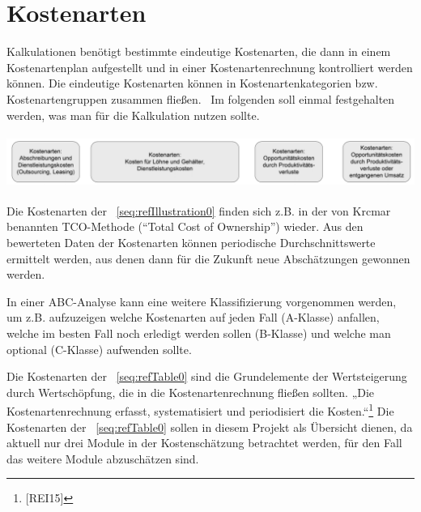 \documentclass[a4paper]{article}
\title{}
\makeatletter
\newcommand\captionof[1]{\def\@captype{#1}\caption}
\makeatother
\begin{document}
\setcounter{tocdepth}{4}
\renewcommand\contentsname{Inhaltsverzeichnis}
\tableofcontents
\section*{}
\clearpage\section{Kostenarten}
\label{bkm:RefHeading24765162299686}
\bigskip

{\sffamily
Kalkulationen benötigt bestimmte eindeutige Kostenarten, die dann in einem Kostenartenplan aufgestellt und in einer
Kostenartenrechnung kontrolliert werden können. Die eindeutige Kostenarten können in Kostenartenkategorien bzw.
Kostenartengruppen zusammen fließen. \ Im folgenden soll einmal festgehalten werden, was man für die Kalkulation nutzen
sollte.}

{\centering \includegraphics[width=15.455cm,height=1.75cm]{INMAusarbeitung02-img/INMAusarbeitung02-img001.png}
\captionof{figure}[Beispiel von Kostenarten in der TCO{}-Methode (Hansen 2009)]{Beispiel von Kostenarten in der
TCO-Methode \textcolor{red}{(Hansen 2009)}}
\label{seq:refIllustration0}
\par}
{\sffamily
Die Kostenarten der \figurename~\ref{seq:refIllustration0} finden sich z.B. in der von Krcmar benannten TCO-Methode
(“Total Cost of Ownership”) wieder. Aus den bewerteten Daten der Kostenarten können periodische Durchschnittswerte
ermittelt werden, aus denen dann für die Zukunft neue Abschätzungen gewonnen werden.}

{\sffamily
In einer ABC-Analyse kann eine weitere Klassifizierung vorgenommen werden, um z.B. aufzuzeigen welche Kostenarten auf
jeden Fall (A-Klasse) anfallen, welche im besten Fall noch erledigt werden sollen (B-Klasse) und welche man optional
(C-Klasse) aufwenden sollte.}


\bigskip

{\sffamily
Die Kostenarten der \tablename~\ref{seq:refTable0} sind die Grundelemente der Wertsteigerung durch Wertschöpfung, die in
die Kostenartenrechnung fließen sollten. „Die Kostenartenrechnung erfasst, systematisiert und periodisiert die
Kosten.“\footnote{[REI15]} Die Kostenarten der \tablename~\ref{seq:refTable0} sollen in diesem Projekt als Übersicht
dienen, da aktuell nur drei Module in der Kostenschätzung betrachtet werden, für den Fall das weitere Module
abzuschätzen sind.}
\end{document}
